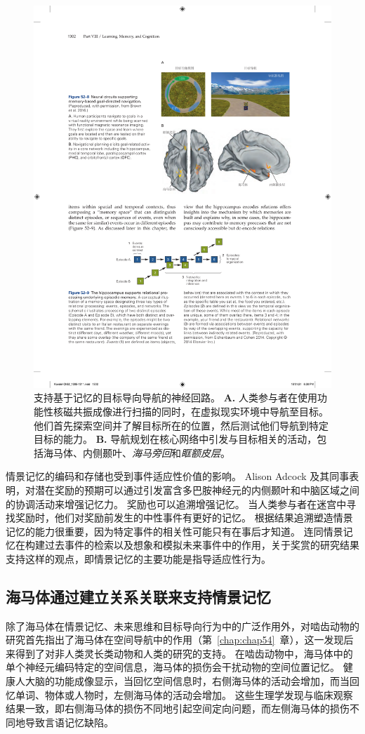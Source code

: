 \begin{figure}[htbp]
	\centering
	\includegraphics[width=0.7\linewidth]{chap52/fig_52_8}
	\caption{支持基于记忆的目标导向导航的神经回路\cite{brown2016prospective}。
		\textbf{A.} 人类参与者在使用功能性核磁共振成像进行扫描的同时，在虚拟现实环境中导航至目标。
		他们首先探索空间并了解目标所在的位置，然后测试他们导航到特定目标的能力。
		\textbf{B.} 导航规划在核心网络中引发与目标相关的活动，包括海马体、内侧颞叶、\textit{海马旁回}和\textit{眶额皮层}。}
	\label{fig:52_8}
\end{figure}


情景记忆的编码和存储也受到事件适应性价值的影响。
Alison Adcock 及其同事表明，对潜在奖励的预期可以通过引发富含多巴胺神经元的内侧颞叶和中脑区域之间的协调活动来增强记忆力。
奖励也可以追溯增强记忆。
当人类参与者在迷宫中寻找奖励时，他们对奖励前发生的中性事件有更好的记忆。
根据结果追溯塑造情景记忆的能力很重要，因为特定事件的相关性可能只有在事后才知道。
连同情景记忆在构建过去事件的检索以及想象和模拟未来事件中的作用，关于奖赏的研究结果支持这样的观点，即情景记忆的主要功能是指导适应性行为。



\subsection{海马体通过建立关系关联来支持情景记忆}

除了海马体在情景记忆、未来思维和目标导向行为中的广泛作用外，对啮齿动物的研究首先指出了海马体在空间导航中的作用（第~\ref{chap:chap54}~章），这一发现后来得到了对非人类灵长类动物和人类的研究的支持。
在啮齿动物中，海马体中的单个神经元编码特定的空间信息，海马体的损伤会干扰动物的空间位置记忆。
健康人大脑的功能成像显示，当回忆空间信息时，右侧海马体的活动会增加，而当回忆单词、物体或人物时，左侧海马体的活动会增加。
这些生理学发现与临床观察结果一致，即右侧海马体的损伤不同地引起空间定向问题，而左侧海马体的损伤不同地导致言语记忆缺陷。


